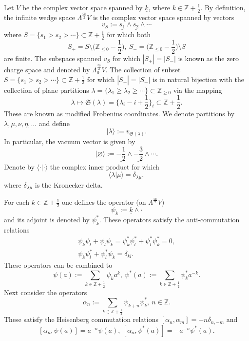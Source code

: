 \documentclass{amsart}
\theoremstyle{definition}
\newcommand{\ZZ} {\mathbb{Z}}		%
\begin{document}
Let $V$ be the complex vector space spanned by $\underline{k}$, where $k \in \ZZ + \frac{1}{2}$. By definition, the infinite wedge space $\Lambda^{\frac{\infty}{2}} V$ is the complex vector space spanned by vectors
$$
v_S := \underline{s_1} \wedge \underline{s_2} \wedge \cdots
$$
where $S = \{s_1 > s_2 > \cdots\} \subset \ZZ + \frac{1}{2}$ for which both 
$$
S_+ = S \setminus \Big(\ZZ_{\leq 0} - \frac{1}{2} \Big), \ S_- = \Big(\ZZ_{\leq 0} - \frac{1}{2} \Big) \setminus S
$$ 
are finite. The subspace spanned $v_S$ for which $|S_+| = |S_-|$ is known as the zero charge space and denoted by $\Lambda^{\frac{\infty}{2}}_{0} V$. The collection of subset $S = \{s_1 > s_2 > \cdots\} \subset \ZZ + \frac{1}{2}$ for which $|S_+| = |S_-|$ is in natural bijection with the collection of plane partitions $\lambda = \{\lambda_1 \geq \lambda_2 \geq \cdots\} \subset \ZZ_{\geq 0}$ via the mapping \cite[2.1.3]{OR}
$$
\lambda \mapsto \mathfrak{S}(\lambda) = \Big\{ \lambda_i - i + \frac{1}{2} \Big\}_i \subset \ZZ + \frac{1}{2}.
$$
These are known as modified Frobenius coordinates. We denote partitions by $\lambda, \mu, \nu, \eta,  \ldots$ and define 
$$|\lambda\rangle := v_{\mathfrak{S}(\lambda)}.$$
In particular, the vacuum vector is given by
$$
|\varnothing \rangle := \underline{-\frac{1}{2}} \wedge \underline{-\frac{3}{2}} \wedge \cdots.
$$
Denote by $\langle \cdot | \cdot \rangle$ the complex inner product for which
$$
\langle \lambda | \mu \rangle = \delta_{\lambda\mu},
$$
where $\delta_{\lambda\mu}$ is the Kronecker delta. 

For each $k \in \ZZ + \frac{1}{2}$ one defines the operator (on $\Lambda^{\frac{\infty}{2}} V$)
$$
\psi_k := \underline{k} \wedge \cdot
$$
and its adjoint is denoted by $\psi_{k}^{*}$. These operators satisfy the anti-commutation relations
\begin{align*}
\psi_k \psi_l + \psi_l \psi_k = \psi_{k}^{*} \psi_{l}^{*} + \psi_{l}^{*} \psi_{k}^{*} = 0, \\ 
\psi_k \psi_{l}^{*} + \psi_{l}^{*} \psi_{k} = \delta_{kl}.  
\end{align*}
These operators can be combined to
$$
\psi(a) := \sum_{k \in \ZZ + \frac{1}{2}} \psi_k a^k, \ \psi^*(a) := \sum_{k \in \ZZ + \frac{1}{2}} \psi_{k}^{*} a^{-k}. 
$$
Next consider the operators 
$$
\alpha_n := \sum_{k \in \ZZ + \frac{1}{2}} \psi_{k+n} \psi_{k}^{*}, \ n \in \ZZ.
$$
These satisfy the Heisenberg commutation relations $[\alpha_n,\alpha_m] = -n \delta_{n,-m}$ and
$$
[\alpha_n, \psi(a)] = a^{-n} \psi(a), \ [\alpha_n, \psi^*(a)] =  - a^{-n} \psi^*(a). 
$$
\end{document}
